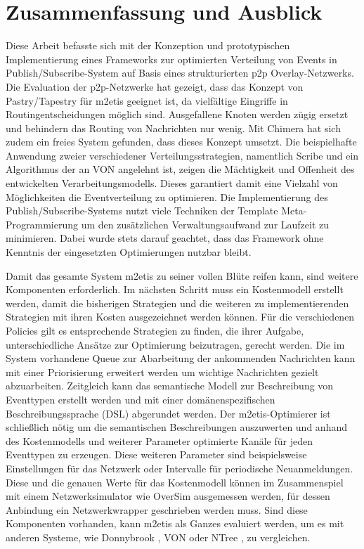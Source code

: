 \chapter{Zusammenfassung und Ausblick} 
\label{chap:zus}
Diese Arbeit befasste sich mit der Konzeption und prototypischen Implementierung eines Frameworks zur optimierten Verteilung von Events in Publish/Subscribe-System auf Basis eines strukturierten p2p Overlay-Netzwerks.\\
Die Evaluation der p2p-Netzwerke hat gezeigt, dass das Konzept von Pastry/Tapestry für \ac{m2etis} geeignet ist, da vielfältige Eingriffe in Routingentscheidungen möglich sind. Ausgefallene Knoten werden zügig ersetzt und behindern das Routing von Nachrichten nur wenig. Mit Chimera hat sich zudem ein freies System gefunden, dass dieses Konzept umsetzt. Die beispielhafte Anwendung zweier verschiedener Verteilungsstrategien, namentlich Scribe und ein Algorithmus der an VON angelehnt ist, zeigen die Mächtigkeit und Offenheit des entwickelten Verarbeitungsmodells. Dieses garantiert damit eine Vielzahl von Möglichkeiten die Eventverteilung zu optimieren. Die Implementierung des Publish/Subscribe-Systems nutzt viele Techniken der Template Meta-Programmierung um den zusätzlichen Verwaltungsaufwand zur Laufzeit zu minimieren. Dabei wurde stets darauf geachtet, dass das Framework ohne Kenntnis der eingesetzten Optimierungen nutzbar bleibt.

Damit das gesamte System \ac{m2etis} zu seiner vollen Blüte reifen kann, sind weitere Komponenten erforderlich. Im nächsten Schritt muss ein Kostenmodell erstellt werden, damit die bisherigen Strategien und die weiteren zu implementierenden Strategien mit ihren Kosten ausgezeichnet werden können. Für die verschiedenen Policies gilt es entsprechende Strategien zu finden, die ihrer Aufgabe, unterschiedliche Ansätze zur Optimierung beizutragen, gerecht werden. Die im System vorhandene Queue zur Abarbeitung der ankommenden Nachrichten kann mit einer Priorisierung erweitert werden um wichtige Nachrichten gezielt abzuarbeiten. Zeitgleich kann das semantische Modell zur Beschreibung von Eventtypen erstellt werden und mit einer domänenspezifischen Beschreibungssprache (DSL) abgerundet werden. Der \ac{m2etis}-Optimierer ist schließlich nötig um die semantischen Beschreibungen auszuwerten und anhand des Kostenmodells und weiterer Parameter optimierte Kanäle für jeden Eventtypen zu erzeugen. Diese weiteren Parameter sind beispielsweise Einstellungen für das Netzwerk oder Intervalle für periodische Neuanmeldungen. Diese und die genauen Werte für das Kostenmodell können im Zusammenspiel mit einem Netzwerksimulator wie OverSim \cite{Baumgart2007OverSim} ausgemessen werden, für dessen Anbindung ein Netzwerkwrapper geschrieben werden muss. Sind diese Komponenten vorhanden, kann \ac{m2etis} als Ganzes evaluiert werden, um es mit anderen Systeme, wie Donnybrook \cite{Bharambe2008Donnybrook}, VON \cite{Hu2006VON} oder NTree \cite{GauthierDickey2005Using}, zu vergleichen.
